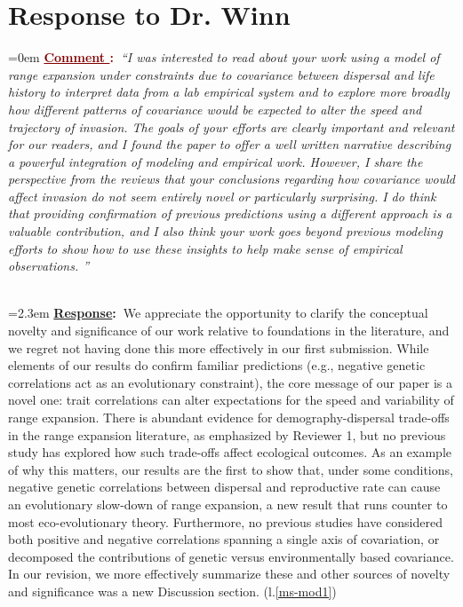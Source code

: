 \documentclass[12pt]{article}
\newcounter{cN}
\newcommand{\comment}[1]{
	\vspace{2em}
	\refstepcounter{cN} %
	\noindent \hangindent=0em \textbf{\textcolor{Maroon}{\uline{Comment \thecN}:~}}\emph{``#1''}
	}
\newcommand{\response}[1]{
	\\[0.25em]
	\hangindent=2.3em \textbf{\textcolor{NavyBlue}{\uline{Response}:~}}#1
	}
\begin{document}
\section{Response to Dr. Winn}
\vspace{-2em}

\comment{I was interested to read about your work using a model of range expansion under constraints due to covariance between dispersal and life history to interpret data from a lab empirical system and to explore more broadly how different patterns of covariance would be expected to alter the speed and trajectory of invasion.
The goals of your efforts are clearly important and relevant for our readers, and I found the paper to offer a well written narrative describing a powerful integration of modeling and empirical work.
However, I share the perspective from the reviews that your conclusions regarding how covariance would affect invasion do not seem entirely novel or particularly surprising.
I do think that providing confirmation of previous predictions using a different approach is a valuable contribution, and I also think your work goes beyond previous modeling efforts to show how to use these insights to help make sense of empirical observations. }
\response{We appreciate the opportunity to clarify the conceptual novelty and significance of our work relative to foundations in the literature, and we regret not having done this more effectively in our first submission.
While elements of our results do confirm familiar predictions (e.g., negative genetic correlations act as an evolutionary constraint), the core message of our paper is a novel one: trait correlations can alter expectations for the speed and variability of range expansion.
There is abundant evidence for demography-dispersal trade-offs in the range expansion literature, as emphasized by Reviewer 1, but no previous study has explored how such trade-offs affect ecological outcomes.
As an example of why this matters, our results are the first to show that, under some conditions, negative genetic correlations between dispersal and reproductive rate can cause an evolutionary slow-down of range expansion, a new result that runs counter to most eco-evolutionary theory.
Furthermore, no previous studies have considered both positive and negative correlations spanning a single axis of covariation, or decomposed the contributions of genetic versus environmentally based covariance.
In our revision, we more effectively summarize these and other sources of novelty and significance was a new Discussion section. (l.\ref{ms-mod1})}
\end{document}
